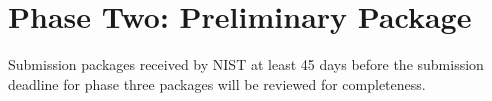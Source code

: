 \section{Phase Two: Preliminary Package}

Submission packages received by NIST at least 45 days before the submission
deadline for phase three packages will be reviewed for completeness.
